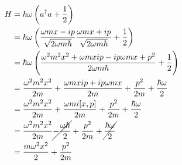 \documentclass[a4paper,german,12pt,smallheadings]{scrartcl}
\begin{document}
\begin{enumerate}[a)]
    \begin{align*}
      H &= \hbar \omega \del{a^\dagger a + \frac{1}{2}} \\
        &= \hbar \omega \del{\frac{\omega m x - i p}{\sqrt{2 \omega m \hbar}} \frac{\omega m x + i p}{\sqrt{2 \omega m \hbar}} + \frac{1}{2}} \\
        &= \hbar \omega \del{\frac{\omega^2m^2x^2 + \omega m x ip - ip\omega m x + p^2}{2 \omega m \hbar} + \frac{1}{2}} \\
        &= \frac{\omega^2 m^2 x^2}{2 m} + \frac{\omega m x i p + i p \omega m x}{2m} + \frac{p^2}{2m} + \frac{\hbar \omega}{2} \\
        &= \frac{\omega^2 m^2 x^2}{2 m} + \frac{\omega m i [x,p]}{2m} + \frac{p^2}{2m} + \frac{\hbar \omega}{2} \\
        &= \frac{\omega^2 m^2 x^2}{2 m} \cancel{- \frac{\omega \hbar}{2}} + \frac{p^2}{2m} + \cancel{\frac{\hbar \omega}{2}} \\
        &= \frac{m \omega^2 x^2}{2} + \frac{p^2}{2m}
    \end{align*}

\end{enumerate}
\end{document}
